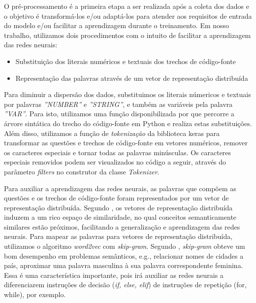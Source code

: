 O pré-processamento é a primeira etapa a ser realizada após a coleta dos dados e o objetivo é transformá-los e/ou adaptá-los para atender aos requisitos de entrada do modelo e/ou facilitar a aprendizagem durante o treinamento. Em nosso trabalho, utilizamos dois procedimentos com o intuito de facilitar a aprendizagem das redes neurais:

\begin{itemize}
    \item Substituição dos literais numéricos e textuais dos trechos de código-fonte
    \item Representação das palavras através de um vetor de representação distribuída
\end{itemize}

Para diminuir a dispersão dos dados, substituimos os literais númericos e textuais por palavras \emph{''NUMBER''} e \emph{''STRING''}, e também as variáveis pela palavra \emph{''VAR''}. Para isto, utilizamos uma função disponibilizada por \cite{yao-2018} que percorre a árvore sintática do trecho do código-fonte em Python e realiza estas substituições. Além disso, utilizamos a função de \textit{tokenização} da biblioteca \Gls{keras} para transformar as questões e trechos de código-fonte em vetores numéricos, remover os caracteres especiais e tornar todas as palavras minúsculas. Os caracteres especiais removidos podem ser visualizados no código a seguir, através do parâmetro \textit{filters} no construtor da classe \textit{Tokenizer}.



Para auxiliar a aprendizagem das redes neurais, as palavras que compõem as questões e os trechos de código-fonte foram representados por um vetor de representação distribuída. Segundo \cite{Goodfellow-et-al-2016:representation-learning}, os vetores de representação distribuída induzem a um rico espaço de similaridade, no qual conceitos semanticamente similares estão próximos, facilitando a generalização e aprendizagem das redes neurais. Para mapear as palavras para vetores de representação distribuída, utilizamos o algoritmo \textit{word2vec} com \textit{skip-gram}. Segundo \cite{mikolov2013distributed}, \textit{skip-gram} obteve um bom desempenho em problemas semânticos, e.g., relacionar nomes de cidades a país, aproximar uma palavra masculina à sua palavra correspondente feminina. Essa é uma característica importante, pois irá auxiliar as redes neurais a diferenciarem instruções de decisão (\textit{if, else, elif}) de instruções de repetição (for, while), por exemplo. 

